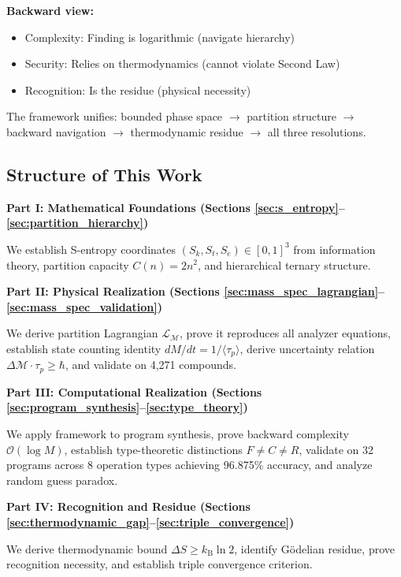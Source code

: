 \documentclass[twocolumn,10pt]{revtex4-2}
\theoremstyle{definition}
\theoremstyle{remark}
\newcommand{\kB}{k_{\mathrm{B}}}
\newcommand{\Sk}{S_k}
\newcommand{\St}{S_t}
\newcommand{\Se}{S_e}
\newcommand{\bigO}{\mathcal{O}}
\newcommand{\Mdepth}{\mathcal{M}}
\newcommand{\Lagr}{\mathcal{L}}
\newcommand{\taup}{\tau_p}
\begin{document}
\textbf{Backward view:}
\begin{itemize}
\item Complexity: Finding is logarithmic (navigate hierarchy)
\item Security: Relies on thermodynamics (cannot violate Second Law)
\item Recognition: Is the residue (physical necessity)
\end{itemize}

\vspace{0.2cm}
\noindent The framework unifies: bounded phase space $\to$ partition structure $\to$ backward navigation $\to$ thermodynamic residue $\to$ all three resolutions.

\subsection{Structure of This Work}

\textbf{Part I: Mathematical Foundations (Sections \ref{sec:s_entropy}--\ref{sec:partition_hierarchy})}

We establish S-entropy coordinates $(\Sk, \St, \Se) \in [0,1]^3$ from information theory, partition capacity $C(n) = 2n^2$, and hierarchical ternary structure.

\vspace{0.2cm}
\noindent\textbf{Part II: Physical Realization (Sections \ref{sec:mass_spec_lagrangian}--\ref{sec:mass_spec_validation})}

We derive partition Lagrangian $\Lagr_{\Mdepth}$, prove it reproduces all analyzer equations, establish state counting identity $dM/dt = 1/\langle\taup\rangle$, derive uncertainty relation $\Delta\Mdepth \cdot \taup \geq \hbar$, and validate on 4,271 compounds.

\vspace{0.2cm}
\noindent\textbf{Part III: Computational Realization (Sections \ref{sec:program_synthesis}--\ref{sec:type_theory})}

We apply framework to program synthesis, prove backward complexity $\bigO(\log M)$, establish type-theoretic distinctions $F \neq C \neq R$, validate on 32 programs across 8 operation types achieving 96.875\% accuracy, and analyze random guess paradox.

\vspace{0.2cm}
\noindent\textbf{Part IV: Recognition and Residue (Sections \ref{sec:thermodynamic_gap}--\ref{sec:triple_convergence})}

We derive thermodynamic bound $\Delta S \geq \kB \ln 2$, identify Gödelian residue, prove recognition necessity, and establish triple convergence criterion.
\end{document}
